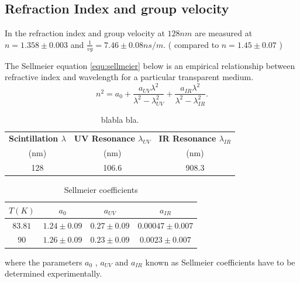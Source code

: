\documentclass[a4paper]{jpconf}
\begin{document}
\subsection{Refraction Index and group velocity}

In \cite{ref:vg} the refraction index and group velocity  at $128 nm$ are measured at $n = 1.358 \pm 0.003$ and $\frac{1}{vg} = 7.46 \pm 0.08 ns/m$.
                            ( compared to $n= 1.45 \pm 0.07$ \cite{ref:grace})

The Sellmeier equation \ref{equ:sellmeier} below is an empirical relationship between refractive index and wavelength for a particular transparent medium.
\begin{equation}
n^2 = a_0 + \frac{a_{UV} \lambda^2}{\lambda^2 -\lambda^2_{UV}}+\frac{a_{IR}\lambda^2}{\lambda^2 - \lambda^2_{IR}}.
 \label{equ:sellmeier}
\end{equation}

 \begin{table}[h!]
  \begin{center}
    \label{tab:table1}
    \begin{tabular}{|c|c|c|} 
      \hline
      \textbf{ Scintillation $\lambda$} &\textbf{UV Resonance $\lambda_{UV}$} &\textbf{IR Resonance $\lambda_{IR}$}\\
 (nm)           & (nm)          &(nm) \\
      \hline
128 & 106.6 &908.3\\
      \hline
    \end{tabular}
  \end{center}
  \caption{blabla bla.}
 \end{table}
 
 \begin{table}[h!]
  \begin{center}
    \label{tab:table1}
    \begin{tabular}{|c|c|c|c|} 
      \hline
\textbf{ $T (K) $}& \textbf{ $a_0$} & \textbf{ $a_{UV}$} & \textbf{ $a_{IR}$ }\\
\hline
      $83.81$ & $1.24\pm0.09$ & $0.27\pm0.09$ & $0.00047\pm0.007$ \\
$90$ & $1.26\pm 0.09$& $0.23\pm 0.09$ & $0.0023\pm0.007$ \\
      \hline
    \end{tabular}
  \end{center}
  \caption{Sellmeier coefficients}
 \end{table}
 
where the parameters $a_0$ , $a_{UV}$ and $a_{IR}$ known as Sellmeier coefficients have to be determined
experimentally.
 
\end{document}
